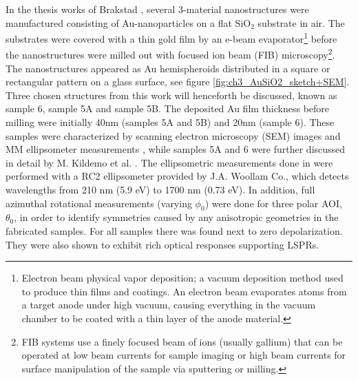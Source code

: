 In the thesis works of Brakstad \cite{brakstad_thesis}, several 3-material nanostructures were manufactured consisting of Au-nanoparticles on a flat SiO$_2$ substrate in air. The substrates were covered with a thin gold film by an e-beam evaporator\footnote{Electron beam physical vapor deposition; a vacuum deposition method used to produce thin films and coatings. An electron beam evaporates atoms from a target anode under high vacuum, causing everything in the vacuum chamber to be coated with a thin layer of the anode material\cite{ebeam_evap_nanolab}.} before the nanostructures were milled out with focused ion beam (FIB) microscopy\footnote{FIB systems use a finely focused beam of ions (usually gallium) that can be operated at low beam currents for sample imaging or high beam currents for surface manipulation of the sample via sputtering or milling\cite{fib_nanolab}.}. The nanostructures appeared as Au hemispheroids distributed in a square or rectangular pattern on a glass surface, see figure \ref{fig:ch3_AuSiO2_sketch+SEM}. Three chosen structures from this work will henceforth be discussed, known as sample 6, sample 5A and sample 5B. The deposited Au film thickness before milling were initially 40nm (samples 5A and 5B) and 20nm (sample 6). These samples were characterized by scanning electron microscopy (SEM) images and MM ellipsometer measurements \cite{brakstad_thesis}, while samples 5A and 6 were further discussed in detail by M. Kildemo et al. \cite{Brakstad:15}\cite{Kildemo2017}. The ellipsometric measurements done in \cite{brakstad_thesis} were performed with a RC2 ellipsometer provided by J.A. Woollam Co., which detects wavelengths from 210 nm (5.9 eV) to 1700 nm (0.73 eV). In addition, full azimuthal rotational measurements (varying $\phi_0$) were done for three polar AOI, $\theta_0$, in order to identify symmetries caused by any anisotropic geometries in the fabricated samples. For all samples there was found next to zero depolarization. They were also shown to exhibit rich optical responses supporting LSPRs\cite{brakstad_thesis}. 

